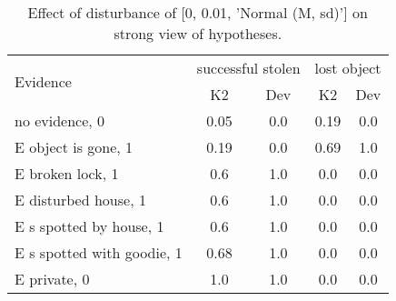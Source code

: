 \begin{table}\begin{tabular}{l|cc|cc}\toprule\multirow{2}{*}{Evidence} & \multicolumn{2}{c}{successful stolen}& \multicolumn{2}{c}{lost object}\\& {K2} & {Dev}& {K2} & {Dev}\\\midrule
no evidence, 0 & \cellcolor{Bittersweet}0.05&\cellcolor{Bittersweet}0.0&\cellcolor{Bittersweet}0.19&\cellcolor{Bittersweet}0.0\\E object is gone, 1 & \cellcolor{Bittersweet}0.19&\cellcolor{Bittersweet}0.0&\cellcolor{Bittersweet}0.69&\cellcolor{Bittersweet}1.0\\E broken lock, 1 & \cellcolor{Bittersweet}0.6&\cellcolor{Bittersweet}1.0&\cellcolor{Bittersweet}0.0&\cellcolor{Bittersweet}0.0\\E disturbed house, 1 & \cellcolor{Bittersweet}0.6&\cellcolor{Bittersweet}1.0&\cellcolor{Bittersweet}0.0&\cellcolor{Bittersweet}0.0\\E s spotted by house, 1 & \cellcolor{Bittersweet}0.6&\cellcolor{Bittersweet}1.0&\cellcolor{Bittersweet}0.0&\cellcolor{Bittersweet}0.0\\E s spotted with goodie, 1 & \cellcolor{Bittersweet}0.68&\cellcolor{Bittersweet}1.0&\cellcolor{Bittersweet}0.0&\cellcolor{Bittersweet}0.0\\E private, 0 & \cellcolor{Bittersweet}1.0&\cellcolor{Bittersweet}1.0&\cellcolor{Bittersweet}0.0&\cellcolor{Bittersweet}0.0\\\bottomrule\end{tabular}\caption{Effect of disturbance of [0, 0.01, 'Normal (M, sd)'] on strong view of hypotheses.}\end{table}